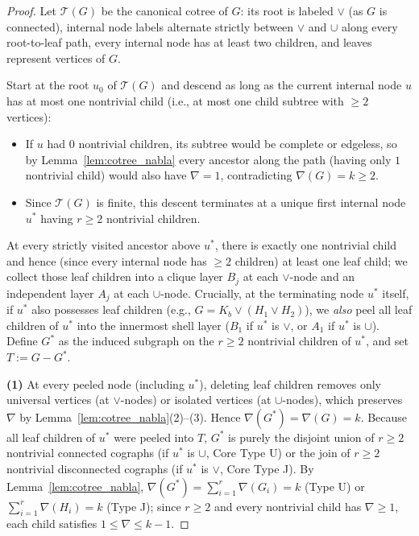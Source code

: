 \documentclass[11pt,a4paper]{article}
\theoremstyle{definition}
\begin{document}
\begin{proof}
  Let $\mathcal{T}(G)$ be the canonical cotree of $G$: its root is labeled $\vee$ (as $G$ is connected), internal node labels alternate strictly between $\vee$ and $\cup$ along every root-to-leaf path, every internal node has at least two children, and leaves represent vertices of $G$.

  Start at the root $u_0$ of $\mathcal{T}(G)$ and descend as long as the current internal node $u$ has at most one nontrivial child (i.e., at most one child subtree with $\ge 2$ vertices):
  \begin{itemize}
    \item If $u$ had $0$ nontrivial children, its subtree would be complete or edgeless, so by Lemma~\ref{lem:cotree_nabla} every ancestor along the path (having only $1$ nontrivial child) would also have $\nabla = 1$, contradicting $\nabla(G) = k \ge 2$.
    \item Since $\mathcal{T}(G)$ is finite, this descent terminates at a unique first internal node $u^*$ having $r \ge 2$ nontrivial children.
  \end{itemize}
  At every strictly visited ancestor above $u^*$, there is exactly one nontrivial child and hence (since every internal node has $\ge 2$ children) at least one leaf child; we collect those leaf children into a clique layer $B_j$ at each $\vee$-node and an independent layer $A_j$ at each $\cup$-node. Crucially, at the terminating node $u^*$ itself, if $u^*$ also possesses leaf children (e.g., $G = K_b \vee (H_1 \vee H_2)$), we \emph{also} peel all leaf children of $u^*$ into the innermost shell layer ($B_1$ if $u^*$ is $\vee$, or $A_1$ if $u^*$ is $\cup$). Define $G^*$ as the induced subgraph on the $r \ge 2$ nontrivial children of $u^*$, and set $T := G - G^*$.

  \textbf{(1)} At every peeled node (including $u^*$), deleting leaf children removes only universal vertices (at $\vee$-nodes) or isolated vertices (at $\cup$-nodes), which preserves $\nabla$ by Lemma~\ref{lem:cotree_nabla}(2)--(3). Hence $\nabla(G^*) = \nabla(G) = k$. Because all leaf children of $u^*$ were peeled into $T$, $G^*$ is purely the disjoint union of $r \ge 2$ nontrivial connected cographs (if $u^*$ is $\cup$, Core Type U) or the join of $r \ge 2$ nontrivial disconnected cographs (if $u^*$ is $\vee$, Core Type J). By Lemma~\ref{lem:cotree_nabla}, $\nabla(G^*) = \sum_{i=1}^r \nabla(G_i) = k$ (Type U) or $\sum_{i=1}^r \nabla(H_i) = k$ (Type J); since $r \ge 2$ and every nontrivial child has $\nabla \ge 1$, each child satisfies $1 \le \nabla \le k - 1$.


\end{proof}
\end{document}
